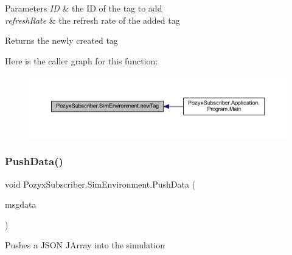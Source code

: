 \begin{DoxyParams}{Parameters}
{\em ID} & the ID of the tag to add\\
\hline
{\em refresh\+Rate} & the refresh rate of the added tag\\
\hline
\end{DoxyParams}
\begin{DoxyReturn}{Returns}
the newly created tag 
\end{DoxyReturn}
Here is the caller graph for this function\+:
\nopagebreak
\begin{figure}[H]
\begin{center}
\leavevmode
\includegraphics[width=350pt]{class_pozyx_subscriber_1_1_sim_environment_af4ddb163b4b711c2c1105c7fc0253af9_icgraph}
\end{center}
\end{figure}
\mbox{\label{class_pozyx_subscriber_1_1_sim_environment_abd4106d662f4991da45aa743b24c4d88}} 
\subsubsection{\texorpdfstring{Push\+Data()}{PushData()}}
{\footnotesize\ttfamily void Pozyx\+Subscriber.\+Sim\+Environment.\+Push\+Data (\begin{DoxyParamCaption}\item[{J\+Array}]{msgdata }\end{DoxyParamCaption})}



Pushes a J\+S\+ON J\+Array into the simulation 


